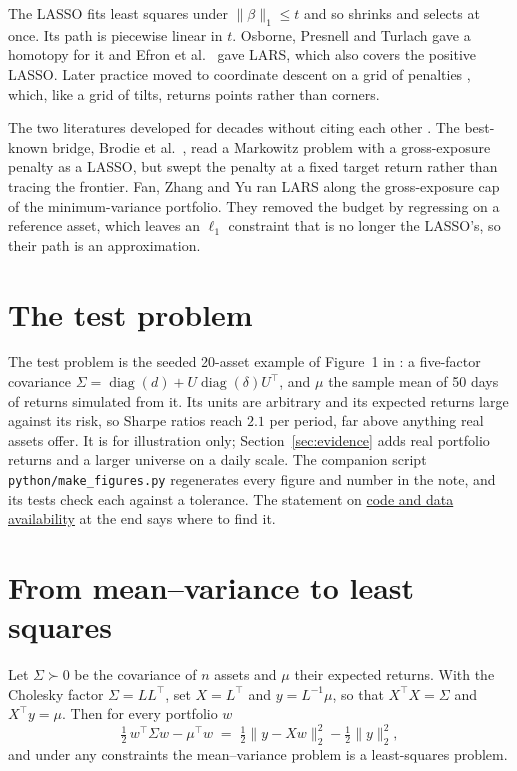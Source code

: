 \documentclass[11pt]{article}
\newcommand{\trans}{^{\top}}
\newcommand{\Sig}{\Sigma}
\begin{document}
The LASSO fits least squares under $\|\beta\|_1\le t$ and so shrinks and selects at once.
Its path is piecewise linear in $t$. Osborne, Presnell and Turlach \cite{osborne2000}
gave a homotopy for it and Efron et al.\ \cite{efron2004} gave LARS, which also covers
the positive LASSO. Later practice moved to coordinate descent on a grid of penalties
\cite{friedman2010}, which, like a grid of tilts, returns points rather than corners.

The two literatures developed for decades without citing each other
\cite[\S5]{perspective}. The best-known
bridge, Brodie et al.\ \cite{brodie2009}, read a Markowitz problem with a gross-exposure
penalty as a LASSO, but swept the penalty at a fixed target return rather than tracing
the frontier. Fan, Zhang and Yu \cite{fan2012} ran LARS along the gross-exposure cap of
the minimum-variance portfolio. They removed the budget by regressing on a reference
asset, which leaves an $\ell_1$ constraint that is no longer the LASSO's, so their path
is an approximation.

\section{The test problem}
\label{sec:test}

The test problem is the seeded 20-asset example of Figure~1 in \cite{perspective}: a five-factor
covariance $\Sig=\operatorname{diag}(d)+U\operatorname{diag}(\delta)U\trans$, and $\mu$
the sample mean of 50 days of returns simulated from it. Its units are arbitrary and
its expected returns large against its risk, so Sharpe ratios reach $2.1$ per period, far
above anything real assets offer. It is for illustration only; Section~\ref{sec:evidence}
adds real portfolio returns and a larger universe on a daily scale. The companion script
\texttt{python/make\_figures.py} regenerates every figure and number in the note, and its tests
check each against a tolerance. The statement on
\hyperref[sec:availability]{code and data availability} at the end says where to find it.

\section{From mean--variance to least squares}
\label{sec:sub}

Let $\Sig\succ0$ be the covariance of $n$ assets and $\mu$ their expected returns. With
the Cholesky factor $\Sig=LL\trans$, set $X=L\trans$ and $y=L^{-1}\mu$, so that
$X\trans X=\Sig$ and $X\trans y=\mu$. Then for every portfolio $w$
\begin{equation}
\label{eq:square}
\tfrac12\,w\trans\Sig w-\mu\trans w
\;=\; \tfrac12\|y-Xw\|_2^2-\tfrac12\|y\|_2^2 ,
\end{equation}
and under any constraints the mean--variance problem is a least-squares problem.
\end{document}

